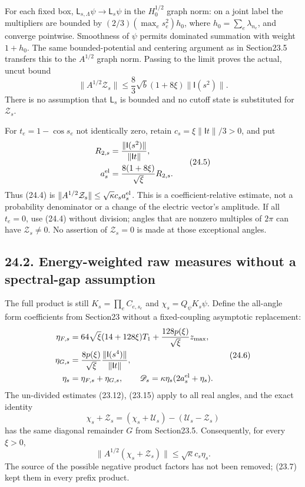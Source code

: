 \documentclass[
]{article}
\begin{document}
For each fixed box, \(\mathsf L_{s,\Lambda}\psi\to\mathsf L_s\psi\) in
the \(H_0^{1/2}\) graph norm: on a joint label the multipliers are
bounded by \((2/3)(\max_es_e^2)h_0\), where \(h_0=\sum_e\lambda_{n_e}\),
and converge pointwise. Smoothness of \(\psi\) permits dominated
summation with weight \(1+h_0\). The same bounded-potential and
centering argument as in Section23.5 transfers this to the \(A^{1/2}\)
graph norm. Passing to the limit proves the actual, uncut bound \[
\|A^{1/2}\mathcal Z_s\|
 \le\frac83\sqrt b(1+8\xi)\|\mathsf I(s^2)\|.
\tag{24.4}
\] There is no assumption that \(\mathsf L_s\) is bounded and no cutoff
state is substituted for \(\mathcal Z_s\).

For \(t_e=1-\cos s_e\) not identically zero, retain
\(c_s=\xi\|\mathsf It\|/3>0\), and put \[
\begin{aligned}
R_{2,s}&=\frac{\|\mathsf I(s^2)\|}{\|\mathsf It\|},\\
a_s^{\rm el}&=\frac{8(1+8\xi)}{\sqrt\xi}R_{2,s}.
\end{aligned}\tag{24.5}
\] Thus (24.4) is
\(\|A^{1/2}\mathcal Z_s\|\le\sqrt\kappa c_s a_s^{\rm el}\). This is a
coefficient-relative estimate, not a probability denominator or a change
of the electric vector's amplitude. If all \(t_e=0\), use (24.4) without
division; angles that are nonzero multiples of \(2\pi\) can have
\(\mathcal Z_s\ne0\). No assertion of \(\mathcal Z_s=0\) is made at
those exceptional angles.

\subsection{24.2. Energy-weighted raw measures without a spectral-gap
assumption}\label{energy-weighted-raw-measures-without-a-spectral-gap-assumption}

The full product is still \(K_s=\prod_eC_{e,s_e}\) and
\(\chi_s=Q_\psi K_s\psi\). Define the all-angle form coefficients from
Section23 without a fixed-coupling asymptotic replacement: \[
\begin{aligned}
\eta_{F,s}
 &=64\sqrt\xi(14+128\xi)T_1
                 +\frac{128p(\xi)}{\sqrt\xi}z_{\max},\\
\eta_{G,s}
 &=\frac{8p(\xi)}{\sqrt\xi}
                      \frac{\|\mathsf I(s^4)\|}{\|\mathsf It\|},\\
\eta_s&=\eta_{F,s}+\eta_{G,s},\qquad
\mathscr D_s=\kappa\eta_s(2a_s^{\rm el}+\eta_s).
\end{aligned}\tag{24.6}
\] The un-divided estimates (23.12), (23.15) apply to all real angles,
and the exact identity \[
\chi_s+\mathcal Z_s
 =(\chi_s+\mathcal U_s)-(\mathcal U_s-\mathcal Z_s)
\] has the same diagonal remainder \(G\) from Section23.5. Consequently,
for every \(\xi>0\), \[
\|A^{1/2}(\chi_s+\mathcal Z_s)\|
\le\sqrt\kappa c_s\eta_s .
\tag{24.7}
\] The source of the possible negative product factors has not been
removed; (23.7) kept them in every prefix product.
\end{document}
